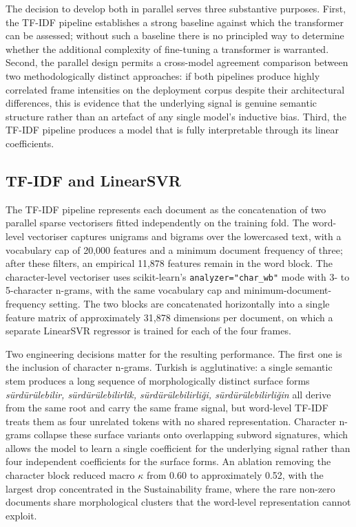 \documentclass[12pt, journal]{IEEEtran}
\begin{document}
The decision to develop both in parallel serves three substantive purposes. First, the TF-IDF pipeline establishes a strong baseline against which the transformer can be assessed; without such a baseline there is no principled way to determine whether the additional complexity of fine-tuning a transformer is warranted. Second, the parallel design permits a cross-model agreement comparison between two methodologically distinct approaches: if both pipelines produce highly correlated frame intensities on the deployment corpus despite their architectural differences, this is evidence that the underlying signal is genuine semantic structure rather than an artefact of any single model's inductive bias. Third, the TF-IDF pipeline produces a model that is fully interpretable through its linear coefficients.

\subsection{TF-IDF and LinearSVR}
The TF-IDF pipeline represents each document as the concatenation of two parallel sparse vectorisers fitted independently on the training fold. The word-level vectoriser captures unigrams and bigrams over the lowercased text, with a vocabulary cap of 20,000 features and a minimum document frequency of three; after these filters, an empirical 11,878 features remain in the word block. The character-level vectoriser uses scikit-learn's \texttt{analyzer="char\_wb"} mode with 3- to 5-character n-grams, with the same vocabulary cap and minimum-document-frequency setting. The two blocks are concatenated horizontally into a single feature matrix of approximately 31,878 dimensions per document, on which a separate LinearSVR regressor is trained for each of the four frames.

Two engineering decisions matter for the resulting performance. The first one is the inclusion of character n-grams. Turkish is agglutinative: a single semantic stem produces a long sequence of morphologically distinct surface forms \textit{s\"urd\"ur\"ulebilir, s\"urd\"ur\"ulebilirlik, s\"urd\"ur\"ulebilirli\u{g}i, s\"urd\"ur\"ulebilirli\u{g}in} all derive from the same root and carry the same frame signal, but word-level TF-IDF treats them as four unrelated tokens with no shared representation. Character n-grams collapse these surface variants onto overlapping subword signatures, which allows the model to learn a single coefficient for the underlying signal rather than four independent coefficients for the surface forms. An ablation removing the character block reduced macro $\kappa$ from 0.60 to approximately 0.52, with the largest drop concentrated in the Sustainability frame, where the rare non-zero documents share morphological clusters that the word-level representation cannot exploit.
\end{document}
